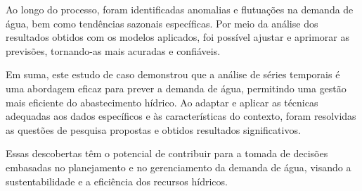 Ao longo do processo, foram identificadas anomalias e flutuações na demanda de água, bem como tendências sazonais específicas. Por meio da análise dos resultados obtidos com os modelos aplicados, foi possível ajustar e aprimorar as previsões, tornando-as mais acuradas e confiáveis.

Em suma, este estudo de caso demonstrou que a análise de séries temporais é uma abordagem eficaz para prever a demanda de água, permitindo uma gestão mais eficiente do abastecimento hídrico. Ao adaptar e aplicar as técnicas adequadas aos dados específicos e às características do contexto, foram resolvidas as questões de pesquisa propostas e obtidos resultados significativos.

Essas descobertas têm o potencial de contribuir para a tomada de decisões embasadas no planejamento e no gerenciamento da demanda de água, visando a sustentabilidade e a eficiência dos recursos hídricos.


